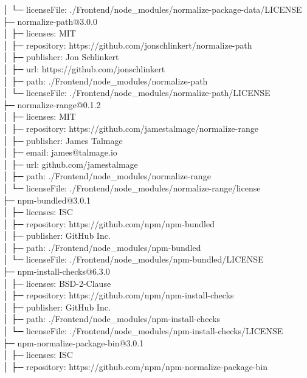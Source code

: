 │  └─ licenseFile: ./Frontend/node\_modules/normalize-package-data/LICENSE\\
├─ normalize-path@3.0.0\\
│  ├─ licenses: MIT\\
│  ├─ repository: https://github.com/jonschlinkert/normalize-path\\
│  ├─ publisher: Jon Schlinkert\\
│  ├─ url: https://github.com/jonschlinkert\\
│  ├─ path: ./Frontend/node\_modules/normalize-path\\
│  └─ licenseFile: ./Frontend/node\_modules/normalize-path/LICENSE\\
├─ normalize-range@0.1.2\\
│  ├─ licenses: MIT\\
│  ├─ repository: https://github.com/jamestalmage/normalize-range\\
│  ├─ publisher: James Talmage\\
│  ├─ email: james@talmage.io\\
│  ├─ url: github.com/jamestalmage\\
│  ├─ path: ./Frontend/node\_modules/normalize-range\\
│  └─ licenseFile: ./Frontend/node\_modules/normalize-range/license\\
├─ npm-bundled@3.0.1\\
│  ├─ licenses: ISC\\
│  ├─ repository: https://github.com/npm/npm-bundled\\
│  ├─ publisher: GitHub Inc.\\
│  ├─ path: ./Frontend/node\_modules/npm-bundled\\
│  └─ licenseFile: ./Frontend/node\_modules/npm-bundled/LICENSE\\
├─ npm-install-checks@6.3.0\\
│  ├─ licenses: BSD-2-Clause\\
│  ├─ repository: https://github.com/npm/npm-install-checks\\
│  ├─ publisher: GitHub Inc.\\
│  ├─ path: ./Frontend/node\_modules/npm-install-checks\\
│  └─ licenseFile: ./Frontend/node\_modules/npm-install-checks/LICENSE\\
├─ npm-normalize-package-bin@3.0.1\\
│  ├─ licenses: ISC\\
│  ├─ repository: https://github.com/npm/npm-normalize-package-bin\\
